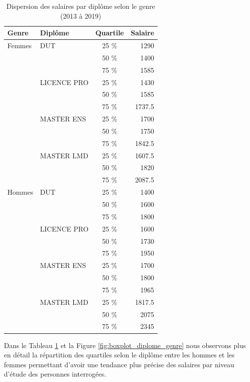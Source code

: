 \documentclass[12pt, a4paper, titlepage, table]{article}
\begin{document}
	\begin{table}[H]
		\centering
		\begin{tabular}{llcr}
			\toprule
			\textbf{Genre} & \textbf{Diplôme} & \textbf{Quartile} & \textbf{Salaire} \\
			\midrule
			Femmes & DUT & 25 \% & 1290 \\
			&     & 50 \% & 1400 \\
			&     & 75 \% & 1585 \\
			\cmidrule{2-4}
			& LICENCE PRO & 25 \% & 1430 \\
			&             & 50 \% & 1585 \\
			&             & 75 \% & 1737.5 \\
			\cmidrule{2-4}
			& MASTER ENS & 25 \% & 1700 \\
			&            & 50 \% & 1750 \\
			&            & 75 \% & 1842.5 \\
			\cmidrule{2-4}
			& MASTER LMD & 25 \% & 1607.5 \\
			&            & 50 \% & 1820 \\
			&            & 75 \% & 2087.5 \\
			\midrule
			Hommes & DUT & 25 \%& 1400 \\
			&     		& 50 \% & 1600 \\
			&     & 75 \% & 1800 \\
			\cmidrule{2-4}
			& LICENCE PRO & 25 \% & 1600 \\
			&             & 50 \% & 1730 \\
			&             & 75 \% & 1950 \\
			\cmidrule{2-4}
			& MASTER ENS & 25 \% & 1700 \\
			&            & 50 \% & 1800 \\
			&            & 75 \% & 1965 \\
			\cmidrule{2-4}
			& MASTER LMD & 25 \% & 1817.5 \\
			&            & 50 \% & 2075 \\
			&            & 75 \% & 2345 \\
			\bottomrule
		\end{tabular}
		\caption{Dispersion des salaires par diplôme selon le genre (2013 à 2019)}
		\label{tab:quartile_values_diplome}
	\end{table}
	
	
	Dans le Tableau \ref{tab:quartile_values_diplome} et la Figure \ref{fig:boxplot_diplome_genre} nous observons plus en détail la répartition des quartiles selon le diplôme entre les hommes et les femmes permettant d'avoir une tendance plus précise des salaires par niveau d'étude des personnes interrogées. 
	
\end{document}
